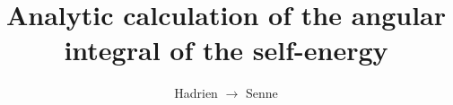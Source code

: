 \documentclass[10pt,a4paper,a4wide]{article}
\newcommand{\be}{\begin{equation}}
\newcommand{\ee}{\end{equation}}
\newcommand{\bea}{\begin{eqnarray}}
\newcommand{\eea}{\end{eqnarray}}
\newcommand{\kk}{\mathbf{k}}
\newcommand{\qq}{\mathbf{q}}
\newcommand{\dd}{\mathrm{d}}
\newcommand{\bb}[1]{\left( #1 \right)}
\begin{document}
\title{Analytic calculation of the angular integral of the self-energy}
\author{Hadrien $\to$ Senne}

\maketitle

%
\end{document}
